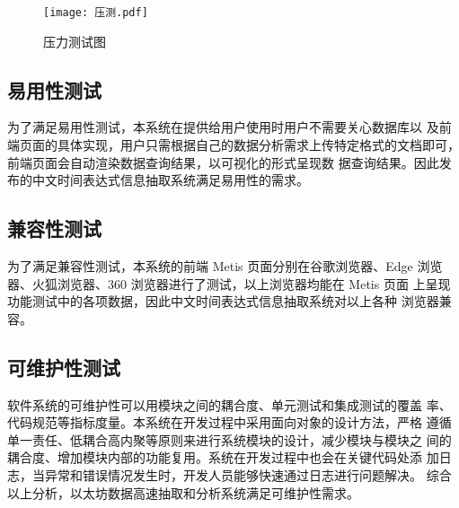 \begin{figure}[h]
    \centering
    \texttt{[image: 压测.pdf]}
    \caption{压力测试图}
    \label{fig:pressure}
\end{figure}


\subsection{易用性测试}

为了满足易用性测试，本系统在提供给用户使用时用户不需要关心数据库以
及前端页面的具体实现，用户只需根据自己的数据分析需求上传特定格式的文档即可，前端页面会自动渲染数据查询结果，以可视化的形式呈现数
据查询结果。因此发布的中文时间表达式信息抽取系统满足易用性的需求。

\subsection{兼容性测试}

为了满足兼容性测试，本系统的前端 Metis 页面分别在谷歌浏览器、Edge
浏览器、火狐浏览器、360 浏览器进行了测试，以上浏览器均能在 Metis 页面
上呈现功能测试中的各项数据，因此中文时间表达式信息抽取系统对以上各种
浏览器兼容。

\subsection{可维护性测试}

软件系统的可维护性可以用模块之间的耦合度、单元测试和集成测试的覆盖
率、代码规范等指标度量。本系统在开发过程中采用面向对象的设计方法，严格
遵循单一责任、低耦合高内聚等原则来进行系统模块的设计，减少模块与模块之
间的耦合度、增加模块内部的功能复用。系统在开发过程中也会在关键代码处添
加日志，当异常和错误情况发生时，开发人员能够快速通过日志进行问题解决。
综合以上分析，以太坊数据高速抽取和分析系统满足可维护性需求。

